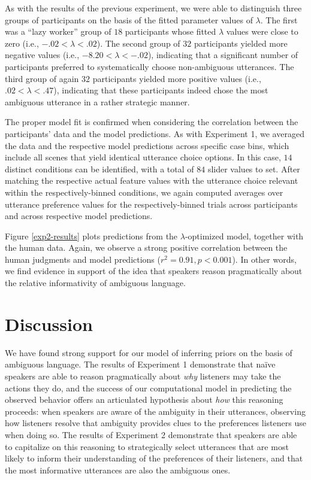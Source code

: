 \documentclass[10pt,a4paper]{article}
\begin{document}
As with the results of the previous experiment, we were able to distinguish three groups of participants on the basis of the fitted parameter values of $\lambda$. 
The first was a ``lazy worker'' group of $18$ participants whose fitted $\lambda$ values were close to zero (i.e.,  $-.02 < \lambda<.02$).
The second group of $32$ participants yielded more negative values (i.e., $-8.20<\lambda<-.02$), indicating that a significant number of participants preferred to systematically choose non-ambiguous utterances. 
The third group of again $32$ participants yielded more positive values (i.e., $.02<\lambda<.47$), indicating that these participants indeed chose the most ambiguous utterance in a rather strategic manner. 


The proper model fit is confirmed when considering the correlation between the participants' data and the model predictions. 
As with Experiment 1, we averaged the data and the respective model predictions across specific case bins, which include all scenes that yield identical utterance choice options. 
In this case, $14$ distinct conditions can be identified, with a total of $84$ slider values to set. 
After matching the respective actual feature values with the utterance choice relevant within the respectively-binned conditions, we again computed averages over utterance preference values for the respectively-binned trials across participants and across respective model predictions. 


Figure \ref{exp2-results} plots predictions from the $\lambda$-optimized model, together with the human data. Again, we observe a strong positive correlation between the human judgments and model predictions ($r^2 = 0.91, p < 0.001$). In other words, we find evidence in support of the idea that speakers reason pragmatically about the relative informativity of ambiguous language.


\section{Discussion}

We have found strong support for our model of inferring priors on the basis of ambiguous language.
The results of Experiment 1 demonstrate that na\"ive speakers are able to reason pragmatically about \emph{why} listeners may take the actions they do, and the success of our computational model in predicting the observed behavior offers an articulated hypothesis about \emph{how} this reasoning proceeds: when speakers are aware of the ambiguity in their utterances, observing how listeners resolve that ambiguity provides clues to the preferences listeners use when doing so.
The results of Experiment 2 demonstrate that speakers are able to capitalize on this reasoning to strategically select utterances that are most likely to inform their understanding of the preferences of their listeners, and that the most informative utterances are also the ambiguous ones.
\end{document}
